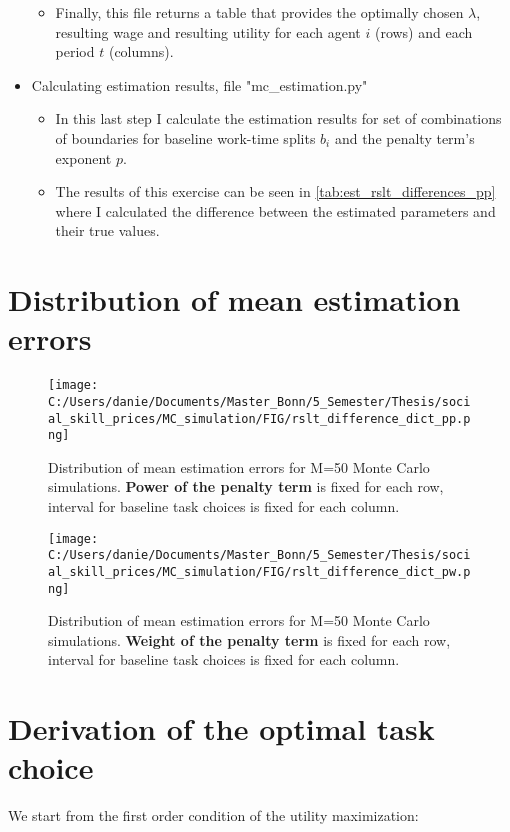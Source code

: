 \documentclass{article}
\begin{document}
\begin{appendix}
\begin{itemize}
\begin{itemize}
			\item{Finally, this file returns a table that provides the optimally chosen $\lambda$, resulting wage and resulting utility for each agent $i$ (rows) and each period $t$ (columns).}
		\end{itemize}
		\item{Calculating estimation results, file "mc\_estimation.py"}
		\begin{itemize}
			\item{In this last step I calculate the estimation results for set of combinations of boundaries for baseline work-time splits $b_i$ and the penalty term's exponent $p$.}
			\item{The results of this exercise can be seen in \ref{tab:est_rslt_differences_pp} where I calculated the difference between the estimated parameters and their true values.}
		\end{itemize}
	\end{itemize}


\section{Distribution of mean estimation errors} \label{appen:dist_mee}
\begin{figure}[ht]
\centering
	\texttt{[image: C:/Users/danie/Documents/Master\_Bonn/5\_Semester/Thesis/social\_skill\_prices/MC\_simulation/FIG/rslt\_difference\_dict\_pp.png]}
	\caption{Distribution of mean estimation errors for M=50 Monte Carlo simulations. \textbf{Power of the penalty term} is fixed for each row, interval for baseline task choices is fixed for each column.}
\end{figure}

\begin{figure}[ht]
	\texttt{[image: C:/Users/danie/Documents/Master\_Bonn/5\_Semester/Thesis/social\_skill\_prices/MC\_simulation/FIG/rslt\_difference\_dict\_pw.png]}
	\caption{Distribution of mean estimation errors for M=50 Monte Carlo simulations. \textbf{Weight of the penalty term} is fixed for each row, interval for baseline task choices is fixed for each column.}
\end{figure}


\section{Derivation of the optimal task choice} \label{appen:lambda_opt}

We start from the first order condition of the utility maximization:


\end{appendix}
\end{document}
